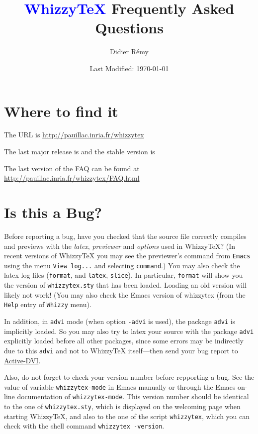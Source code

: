 \documentclass{article}
\title {\textcolor{blue}{WhizzyTeX}  Frequently Asked Questions}
\author {Didier R{\'{e}}my}
\date {Last Modified: \today}
\def \WhizzyTeX{Whizzy\TeX}
\begin{document}
\maketitle

\tableofcontents

\section {Where to find it}

The URL is \url{http://pauillac.inria.fr/whizzytex}

The last major release is {\release}
and the stable version is {\version}

The last version of the FAQ can be found at 
\url{http://pauillac.inria.fr/whizzytex/FAQ.html}

\hypertarget{isitabug}{}
\section {Is this a Bug?}

Before reporting a bug, have you checked that the source file correctly
compiles and previews with the \emph{latex}, \emph{previewer}
and \emph{options} used in {\WhizzyTeX}?
(In recent versions of {\WhizzyTeX} you may see the previewer's command from 
\texttt{Emacs} using the menu \texttt{View log...} and selecting
\texttt{command}.) You may also check the latex log files (\texttt{format}, and
\texttt{latex}, \texttt{slice}). In particular, \texttt{format} will show
you the version of \texttt{whizzytex.sty} that has been loaded. Loading an
old version will likely not work! (You may also check the Emacs version of
whizzytex (from the \texttt{Help} entry of \texttt{Whizzy} menu). 

In addition, in \texttt{advi} mode (when option \texttt{-advi} is used), the
package \texttt{advi} is implicitly loaded. So you may also try to latex
your source with the package \texttt{advi} explicitly loaded before all
other packages, since some errors may be indirectly due to this
\texttt{advi} and not to {\WhizzyTeX} itself---then send your bug report
to \href{http://pauillac.inria.fr/advi/}{Active-DVI}.

Also, do not forget to check your version number before repporting a bug. 
See the value of variable \texttt{whizzytex-mode} in Emacs manually or
through the Emacs on-line documentation of \texttt{whizzytex-mode}. 
This version number should be identical to the one of
\texttt{whizzytex.sty}, which is displayed on the welcoming page when
starting WhizzyTeX, and also  to the one of the script \texttt{whizzytex},
which you can check with the shell command \texttt{whizzytex -version}.
\end{document}
